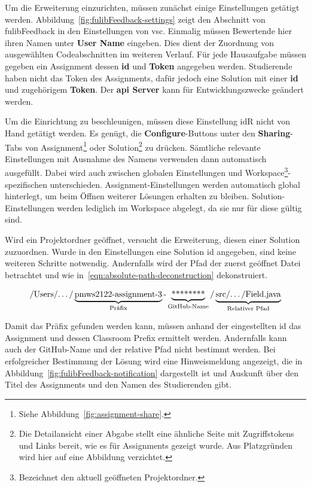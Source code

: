 Um die Erweiterung einzurichten, müssen zunächst einige Einstellungen getätigt werden.
Abbildung~\ref{fig:fulibFeedback-settings} zeigt den Abschnitt von fulibFeedback in den Einstellungen von \ac{vsc}.
Einmalig müssen Bewertende hier ihren Namen unter \textbf{User Name} eingeben.
Dies dient der Zuordnung von ausgewählten Codeabschnitten im weiteren Verlauf.
Für jede Hausaufgabe müssen gegeben ein Assignment dessen \textbf{\acs{id}} und \textbf{Token} angegeben werden.
Studierende haben nicht das Token des Assignments, dafür jedoch eine Solution mit einer \textbf{\acs{id}} und zugehörigem \textbf{Token}.
Der \textbf{\acs{api} Server} kann für Entwicklungszwecke geändert werden.

Um die Einrichtung zu beschleunigen, müssen diese Einstellung \ac{idR} nicht von Hand getätigt werden.
Es genügt, die \textbf{Configure}-Buttons unter den \textbf{Sharing}-Tabs von Assignment\footnote{
    Siehe Abbildung~\ref{fig:assignment-share}.
} oder Solution\footnote{
    Die Detailansicht einer Abgabe stellt eine ähnliche Seite mit Zugriffstokens und Links bereit, wie es für Assignments gezeigt wurde.
    Aus Platzgründen wird hier auf eine Abbildung verzichtet.
} zu drücken.
Sämtliche relevante Einstellungen mit Ausnahme des Namens verwenden dann automatisch ausgefüllt.
Dabei wird auch zwischen globalen Einstellungen und Workspace\footnote{
    Bezeichnet den aktuell geöffneten Projektordner.
}-spezifischen unterschieden.
Assignment-Einstellungen werden automatisch global hinterlegt, um beim Öffnen weiterer Lösungen erhalten zu bleiben.
Solution-Einstellungen werden lediglich im Workspace abgelegt, da sie nur für diese gültig sind.

Wird ein Projektordner geöffnet, versucht die Erweiterung, diesen einer Solution zuzuordnen.
Wurde in den Einstellungen eine Solution \acs{id} angegeben, sind keine weiteren Schritte notwendig.
Andernfalls wird der Pfad der zuerst geöffnet Datei betrachtet und wie in~\ref{eqn:absolute-path-deconstruction} dekonstruiert.

\begin{equation}\label{eqn:absolute-path-deconstruction}
    \text{/Users/\dots/}
    \underbrace{\text{pmws2122-assignment-3}}_{\text{Präfix}}
    \text{-}
    \underbrace{\text{********}}_{\text{GitHub-Name}}
    \text{/}
    \underbrace{\text{src/\dots/Field.java}}_{\text{Relativer Pfad}}
\end{equation}

Damit das Präfix gefunden werden kann, müssen anhand der eingestellten \acs{id} das Assignment und dessen Classroom Prefix ermittelt werden.
Andernfalls kann auch der GitHub-Name und der relative Pfad nicht bestimmt werden.
Bei erfolgreicher Bestimmung der Lösung wird eine Hinweismeldung angezeigt, die in Abbildung~\ref{fig:fulibFeedback-notification} dargestellt ist und Auskunft über den Titel des Assignments und den Namen des Studierenden gibt.

